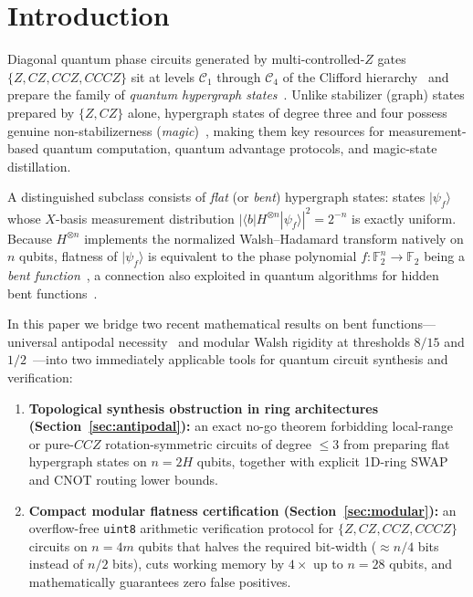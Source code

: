 \documentclass[11pt,a4paper]{article}
\newcommand{\F}{\mathbb{F}}
\newcommand{\ket}[1]{|#1\rangle}
\newcommand{\bra}[1]{\langle#1|}
\begin{document}
\section{Introduction}
Diagonal quantum phase circuits generated by multi-controlled-$Z$ gates $\{Z, CZ, CCZ, CCCZ\}$ sit at levels $\mathcal{C}_1$ through $\mathcal{C}_4$ of the Clifford hierarchy~\cite{Gottesman1999,Cui2017} and prepare the family of \emph{quantum hypergraph states}~\cite{Rossi2013,Qu2013,Gachechiladze2019}. Unlike stabilizer (graph) states prepared by $\{Z, CZ\}$ alone, hypergraph states of degree three and four possess genuine non-stabilizerness (\emph{magic})~\cite{Leone2022}, making them key resources for measurement-based quantum computation, quantum advantage protocols, and magic-state distillation.

A distinguished subclass consists of \emph{flat} (or \emph{bent}) hypergraph states: states $\ket{\psi_f}$ whose $X$-basis measurement distribution $|\bra{b}H^{\otimes n}\ket{\psi_f}|^2 = 2^{-n}$ is exactly uniform. Because $H^{\otimes n}$ implements the normalized Walsh--Hadamard transform natively on $n$ qubits, flatness of $\ket{\psi_f}$ is equivalent to the phase polynomial $f:\F_2^n\to\F_2$ being a \emph{bent function}~\cite{Carlet2021}, a connection also exploited in quantum algorithms for hidden bent functions~\cite{Rotteler2010}.

In this paper we bridge two recent mathematical results on bent functions---universal antipodal necessity~\cite{Vono2026Antipodal} and modular Walsh rigidity at thresholds $8/15$ and $1/2$~\cite{Vono2026Rigidity}---into two immediately applicable tools for quantum circuit synthesis and verification:
\begin{enumerate}
  \item \textbf{Topological synthesis obstruction in ring architectures (Section~\ref{sec:antipodal}):} an exact no-go theorem forbidding local-range or pure-$CCZ$ rotation-symmetric circuits of degree $\le 3$ from preparing flat hypergraph states on $n=2H$ qubits, together with explicit 1D-ring SWAP and CNOT routing lower bounds.
  \item \textbf{Compact modular flatness certification (Section~\ref{sec:modular}):} an overflow-free \texttt{uint8} arithmetic verification protocol for $\{Z, CZ, CCZ, CCCZ\}$ circuits on $n=4m$ qubits that halves the required bit-width ($\approx n/4$ bits instead of $n/2$ bits), cuts working memory by $4\times$ up to $n=28$ qubits, and mathematically guarantees zero false positives.
\end{enumerate}
\end{document}
